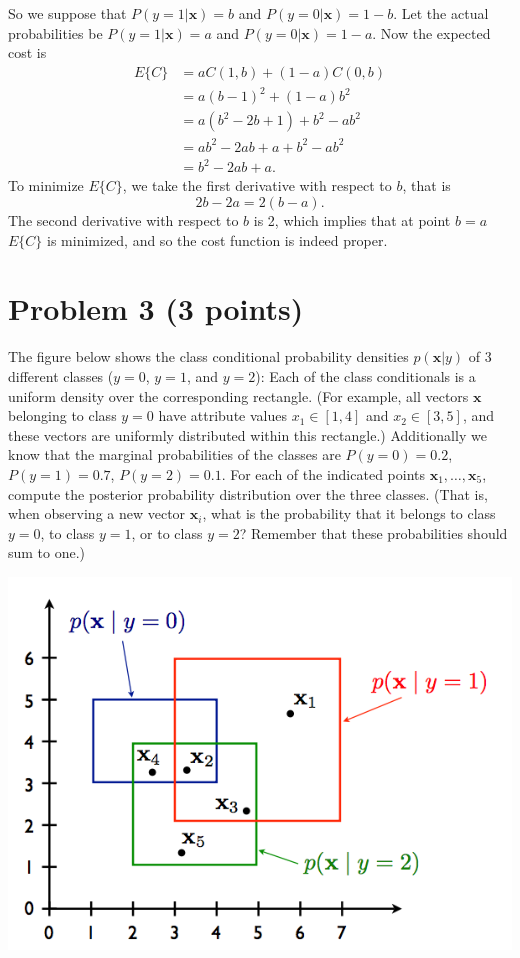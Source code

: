 \documentclass[10pt]{article}
\begin{document}
\color{black}
\noindent So we suppose that $P(y = 1 | \textbf{x}) = b$ and $P(y = 0 | \textbf{x}) = 1 - b$. Let the actual probabilities be $P(y = 1 | \textbf{x}) = a$ and $P(y = 0 | \textbf{x}) = 1 - a$. Now the expected cost is
\begin{align*}
E\{C\} &= aC(1, b) + (1 - a)C(0, b) \\
           &= a(b - 1)^2 + (1 - a)b^2 \\
           &= a(b^2 - 2b + 1) + b^2 - ab^2 \\
           &= ab^2 - 2ab + a + b^2 - ab^2 \\
           &= b^2 - 2ab + a.
\end{align*}
To minimize $E\{C\}$, we take the first derivative with respect to $b$, that is
\[
2b - 2a = 2(b - a).
\]
The second derivative with respect to $b$ is 2, which implies that at point $b = a$ $E\{C\}$ is minimized, and so the cost function is indeed proper.

\color{blue}
\section*{Problem 3 (3 points)}
The figure below shows the class conditional probability densities $p(\textbf{x} | y)$ of 3 different classes ($y = 0$, $y = 1$, and $y = 2$): Each of the class conditionals is a uniform density over the corresponding rectangle. (For example, all vectors $\textbf{x}$ belonging to class $y = 0$ have attribute values $x_1 \in [1, 4]$ and $x_2 \in [3, 5]$, and these vectors are uniformly distributed within this rectangle.) Additionally we know that the marginal probabilities of the classes are $P(y = 0) = 0.2$, $P(y = 1) = 0.7$, $P(y = 2) = 0.1$. For each of the indicated points $\textbf{x}_1, \dots, \textbf{x}_5$, compute the posterior probability distribution over the three classes. (That is, when observing a new vector $\textbf{x}_i$, what is the probability that it belongs to class $y = 0$, to class $y = 1$, or to class $y = 2$? Remember that these probabilities should sum to one.)

\includegraphics[width=\textwidth,keepaspectratio]{rectangles}
\end{document}
